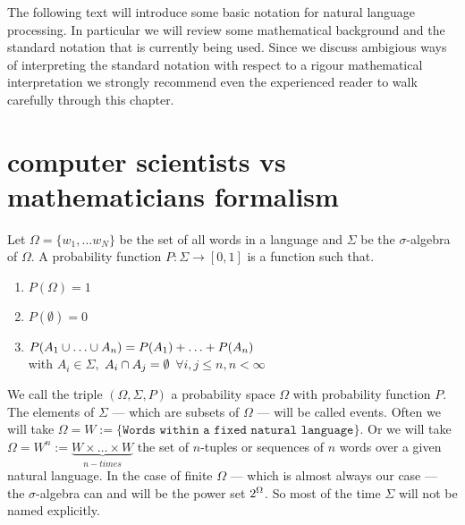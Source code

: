 \documentclass[•]{book}
\begin{document}
The following text will introduce some basic notation for natural language processing. 
In particular we will review some mathematical background and the standard notation that is currently being used.
Since we discuss ambigious ways of interpreting the standard notation with respect to a rigour mathematical interpretation  we strongly recommend even the experienced reader to walk carefully through this chapter. 
\section{computer scientists vs mathematicians formalism}
Let $\Omega=\{w_1,...w_N\}$ be the set of all words in a language and $\Sigma$ be the $\sigma$-algebra of $\Omega$.
A probability function $P:\Sigma \to [0,1]$ is a function such that.
\begin{enumerate}
  \item $P(\Omega) = 1$
  \item $P(\emptyset) = 0$
  \item $P(A_1 \cup \ldots \cup A_n) = P(A_1) + \ldots + P(A_n)$ \\
with $A_i\in\Sigma,$ $A_i \cap A_j = \emptyset$ $\forall i,j \leq n, n < \infty$
\end{enumerate}
We call the triple $(\Omega, \Sigma, P)$ a probability space $\Omega$ with probability function $P$.
The elements of $\Sigma$ --- which are subsets of $\Omega$ ---  will be called events. 
Often we will take $\Omega = W := \{\texttt{Words within a fixed natural language}\}.$
Or we will take $\Omega = W^n :=\underbrace{W\times\dots\times W}_{n-times}$ the set of $n$-tuples or sequences of $n$ words over a given natural language. 
In the case of finite $\Omega$ --- which is almost always our case --- the $\sigma$-algebra can and will be the power set $2^{\Omega}$.
So most of the time $\Sigma$ will not be named explicitly.  
\end{document}
